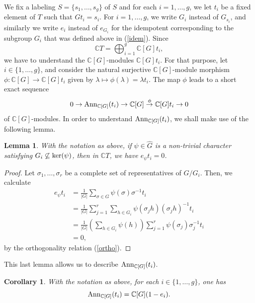 \documentclass[11pt]{amsart}
\newtheorem{lemma}[theorem]{Lemma}
\newtheorem{corollary}[theorem]{Corollary}
\numberwithin{equation}{section}
\theoremstyle{remark}
\theoremstyle{definition}
\begin{document}
We fix a labeling $S = \{s_{1},\ldots,s_{g} \}$ of $S$ and for each $i = 1,\ldots,g$, we let $t_{i}$ be a fixed element of $T$ such that $Gt_{i} = s_{i}$.  For $i=1,\ldots,g$, we write $G_{i}$ instead of $G_{s_{i}}$, and similarly we write $e_{i}$ instead of $e_{G_{i}}$ for the idempotent corresponding to the subgroup $G_{i}$ that was defined above in (\ref{idem}).  Since 
$$\mathbb{C}T = \bigoplus_{i=1}^{g}\mathbb{C}[G] t_{i}, $$
we have to understand the $\mathbb{C}[G]$-modules $\mathbb{C}[G] t_{i}$.  For that purpose, let $i \in \{1,\ldots,g \}$, and consider the natural surjective $\mathbb{C}[G]$-module morphism $\phi:\mathbb{C}[G] \rightarrow \mathbb{C}[G] t_{i}$ given by $\lambda \mapsto \phi(\lambda) = \lambda t_{i}$.  The map $\phi$ leads to a short exact sequence
\begin{equation} \label{ses_us}
0 \rightarrow {\rm Ann}_{\mathbb{C}[G]}(t_{i}) \rightarrow \mathbb{C}[G] \stackrel{\phi}{\rightarrow} \mathbb{C}[G] t_{i} \rightarrow 0   
\end{equation}
of $\mathbb{C}[G]$-modules.  In order to understand ${\rm Ann}_{\mathbb{C}[G]}(t_{i})$, we shall make use of the following lemma.
\begin{lemma} \label{useful_lemma}
With the notation as above, if $\psi \in \widehat{G}$ is a non-trivial character satisfying $G_{i} \not \subseteq {\rm ker}(\psi)$, then in $\mathbb{C}T$, we have $e_{\psi}  t_{i} = 0$.
\end{lemma}
\begin{proof}
Let ${\sigma_{1},\ldots,\sigma_{r}}$ be a complete set of representatives of $G/G_{i}$.  Then, we calculate
\begin{equation*}
\begin{aligned}
e_{\psi} t_{i} &= \frac{1}{|G|} \sum_{\sigma \in G}\psi(\sigma) \sigma^{-1} t_{i} \\
&= \frac{1}{|G|} \sum_{j = 1}^{r}\sum_{h \in G_{i}} \psi(\sigma_{j}h) (\sigma_{j}h)^{-1} t_{i} \\
&= \frac{1}{|G|} \left(\sum_{h \in G_{i}} \psi(h) \right)\sum_{j=1}^{r}  \psi(\sigma_{j}) \sigma_{j}^{-1} t_{i} \\
&= 0,
\end{aligned}
\end{equation*}
by the orthogonality relation (\ref{ortho}).
\end{proof}
This last lemma allows us to describe ${\rm Ann}_{\mathbb{C}[G]}(t_{i})$.
\begin{corollary}
With the notation as above, for each $i \in \{1,\ldots,g \}$, one has
$${\rm Ann}_{\mathbb{C}[G]}(t_{i}) = \mathbb{C}[G](1-e_{i}). $$
\end{corollary}
\end{document}
